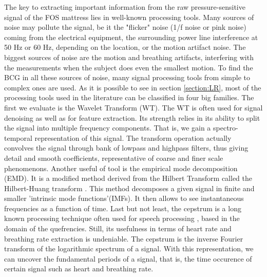 \documentclass[twoside,twocolumn]{article}
\begin{document}
	The key to extracting important information from the raw pressure-sensitive signal of the FOS mattress lies in well-known processing tools. Many sources of noise may pollute the signal, be it the "flicker" noise (1/f noise or pink noise) coming from the electrical equipment, the surrounding power line interference at 50 Hz or 60 Hz, depending on the location, or the motion artifact noise. The biggest sources of noise are the motion and breathing artifacts, interfering with the measurements when the subject does even the smallest motion. To find the BCG in all these sources of noise, many signal processing tools from simple to complex ones are used.
	As it is possible to see in section \ref{section:LR}, most of the processing tools used in the literature can be classified in four big families. The first we evaluate is the Wavelet Transform (WT).
	The WT is often used for signal denoising as well as for feature extraction. Its strength relies in its ability to split the signal into multiple frequency components. That is, we gain a spectro-temporal representation of this signal. The transform operation actually convolves the signal through bank of lowpass and highpass filters, thus giving detail and smooth coefficients, representative of coarse and finer scale phenomenons. 
	Another useful of tool is the empirical mode decomposition (EMD). It is a modified method derived from the Hilbert Transform called the Hilbert-Huang transform \cite{huang_empirical_1998}. This method decomposes a given signal in finite and smaller 'intrinsic mode functions'(IMFs). It then allows to see instantaneous frequencies as a function of time.
	Last but not least, the cepstrum is a long known processing technique often used for speech processing \cite{oppenheim_frequency_2004}, based in the domain of the quefrencies. Still, its usefulness in terms of heart rate and breathing rate extraction is undeniable. The cepstrum is the inverse Fourier transform of the logarithmic spectrum of a signal. With this representation, we can uncover the fundamental periods of a signal, that is, the time occurence of certain signal such as heart and breathing rate.
	
\end{document}
